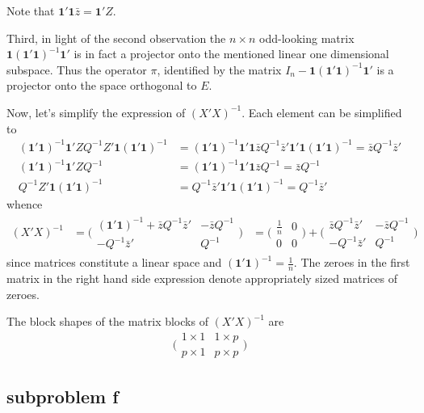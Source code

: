 \documentclass[a4paper]{article}
\newcommand{\e}{\mathbf{1}}
\begin{document}
Note that $\e'\e \bar{z} = \e'Z$.

Third, in light of the second observation the $n\times n$ odd-looking matrix
$\e (\e'\e)^{-1}\e'$ is in fact a projector onto the mentioned linear one
dimensional subspace. Thus the operator $\pi$, identified by the matrix
$I_n - \e (\e'\e)^{-1}\e'$ is a projector onto the space orthogonal to $E$.

Now, let's simplify the expression of $(X'X)^{-1}$. Each element can be
simplified to
\begin{align*}
	(\e'\e)^{-1} \e'Z Q^{-1} Z'\e (\e'\e)^{-1} &= (\e'\e)^{-1} \e'\e \bar{z} Q^{-1} \bar{z}' \e'\e (\e'\e)^{-1} = \bar{z} Q^{-1} \bar{z}'\\
	(\e'\e)^{-1} \e'Z Q^{-1} &= (\e'\e)^{-1} \e'\e \bar{z} Q^{-1} = \bar{z} Q^{-1}\\
	Q^{-1} Z'\e (\e'\e)^{-1} &= Q^{-1} \bar{z}' \e'\e (\e'\e)^{-1} = Q^{-1} \bar{z}'
\end{align*}
whence
\begin{align*}
	(X'X)^{-1}
	&= \bigg(\begin{matrix} (\e'\e)^{-1} + \bar{z} Q^{-1} \bar{z}' & - \bar{z} Q^{-1} \\ - Q^{-1} \bar{z}' & Q^{-1} \end{matrix}\bigg)
	&= \bigg(\begin{matrix} \frac{1}{n} & 0 \\ 0 & 0 \end{matrix}\bigg)
	+ \bigg(\begin{matrix} \bar{z} Q^{-1} \bar{z}' & - \bar{z} Q^{-1} \\ - Q^{-1} \bar{z}' & Q^{-1} \end{matrix}\bigg)
\end{align*}
since matrices constitute a linear space and $(\e'\e)^{-1} = \frac{1}{n}$. The
zeroes in the first matrix in the right hand side expression denote
appropriately sized matrices of zeroes.

The block shapes of the matrix blocks of $(X'X)^{-1}$ are
\[\bigg(\begin{matrix} 1\times 1 & 1\times p \\ p\times 1 & p\times p \end{matrix}\bigg)\] 


\subsection{subproblem f} %
\label{sub:subproblem_f}
\end{document}
